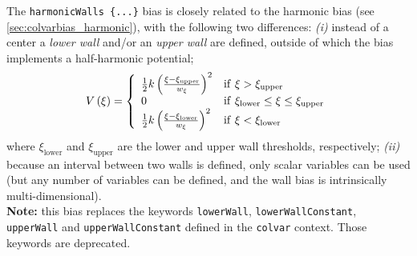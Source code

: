 
The \texttt{harmonicWalls~\{...\}} bias is closely related to the harmonic bias (see \ref{sec:colvarbias_harmonic}), with the following two differences: \emph{(i)} instead of a center a \emph{lower wall} and/or an \emph{upper wall} are defined, outside of which the bias implements a half-harmonic potential;
\begin{equation}
  \label{eq:colvarbias_harmonic_walls}
  V\left(\xi\right) = \left\{
    \begin{array}{l l}
      \frac{1}{2} k \left(\frac{\xi - \xi_{\mathrm{upper}}}{w_{\xi}}\right)^2 & \mathrm{if }\ \xi > \xi_{\mathrm{upper}} \\
      0 & \mathrm{if }\ \xi_{\mathrm{lower}} \leq \xi \leq \xi_{\mathrm{upper}} \\
      \frac{1}{2} k \left(\frac{\xi - \xi_{\mathrm{lower}}}{w_{\xi}}\right)^2 & \mathrm{if }\ \xi < \xi_{\mathrm{lower}}
    \end{array}
  \right.
\end{equation}
where $\xi_{\mathrm{lower}}$ and $\xi_{\mathrm{upper}}$ are the lower and upper wall thresholds, respectively; \emph{(ii)} because an interval between two walls is defined, only scalar variables can be used (but any number of variables can be defined, and the wall bias is intrinsically multi-dimensional).\\

\textbf{Note:} this bias replaces the keywords \texttt{lowerWall}, \texttt{lowerWallConstant}, \texttt{upperWall} and \texttt{upperWallConstant} defined in the \texttt{colvar} context.
Those keywords are deprecated.

